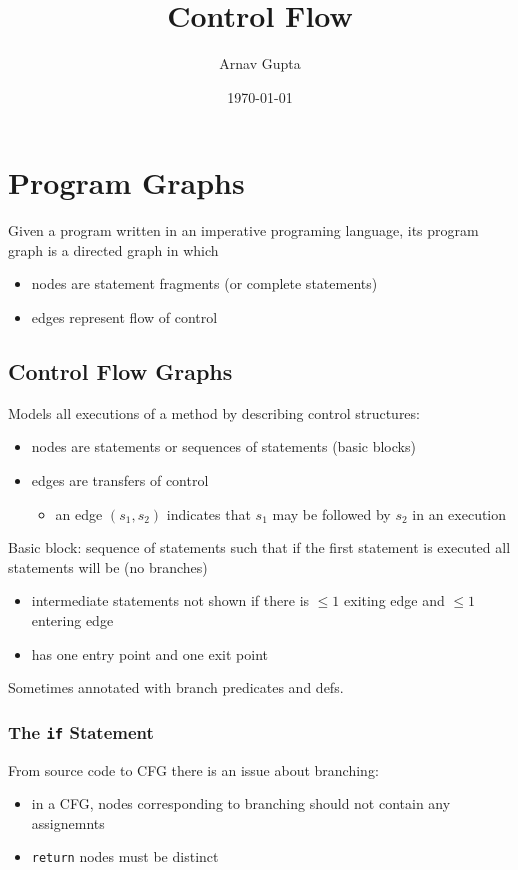 \documentclass[11pt]{article}
\author{Arnav Gupta}
\date{\today}
\title{Control Flow}
\begin{document}
\maketitle
\tableofcontents

\section{Program Graphs}
\label{sec:org6ee9190}
Given a program written in an imperative programing language,
its program graph is a directed graph in which
\begin{itemize}
\item nodes are statement fragments (or complete statements)
\item edges represent flow of control
\end{itemize}
\subsection{Control Flow Graphs}
\label{sec:org9589c83}
Models all executions of a method by describing control structures:
\begin{itemize}
\item nodes are statements or sequences of statements (basic blocks)
\item edges are transfers of control
\begin{itemize}
\item an edge \((s_{1}, s_{2})\) indicates that \(s_{1}\) may be
followed by \(s_{2}\) in an execution
\end{itemize}
\end{itemize}

Basic block: sequence of statements such that if the first statement is executed
all statements will be (no branches)
\begin{itemize}
\item intermediate statements not shown if there is \(\le 1\) exiting edge and \(\le 1\) entering edge
\item has one entry point and one exit point
\end{itemize}

Sometimes annotated with branch predicates and defs.
\subsubsection{The \texttt{if} Statement}
\label{sec:org9f1d856}
From source code to CFG there is an issue about branching:
\begin{itemize}
\item in a CFG, nodes corresponding to branching should not contain any assignemnts
\item \texttt{return} nodes must be distinct
\end{itemize}
\end{document}
